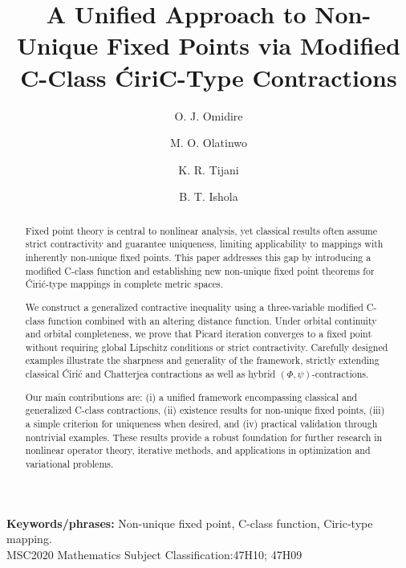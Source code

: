 \documentclass[11pt,reqno]{amsart}
\theoremstyle{definition}
\theoremstyle{remark}
\numberwithin{equation}{section}
\begin{document}
	\title{\bf{A Unified Approach to Non-Unique Fixed Points via Modified C-Class ĆiriC-Type Contractions}}
	\author[O. J. Omidire]{O. J. Omidire}
	\address{\textbf{O. J. Omidire}
		Department of Mathematical Sciences,
		Osun State University, Osogbo, Nigeria.}
\author[M. O. Olatinwo]{M. O. Olatinwo}
\address{\textbf{M. O. Olatinwo}
	Department of Mathematics,
	Obafemi Awolowo University, Ile Ife.}
	\author[K. R. Tijani]{K. R. Tijani}
\address{\textbf{K. R. Tijani}
	Department of Mathematical Sciences,
	Osun State University, Osogbo, Nigeria.}
\author[B. T. Ishola]{B. T. Ishola}
\address{\textbf{B. T. Ishola}
	Department of Mathematics,
	Obafemi Awolowo University, Ile Ife.}
\begin{abstract}
	Fixed point theory is central to nonlinear analysis, yet classical results often assume strict contractivity and guarantee uniqueness, limiting applicability to mappings with inherently non-unique fixed points. This paper addresses this gap by introducing a modified C-class function and establishing new non-unique fixed point theorems for Ćirić-type mappings in complete metric spaces.
	
	We construct a generalized contractive inequality using a three-variable modified C-class function combined with an altering distance function. Under orbital continuity and orbital completeness, we prove that Picard iteration converges to a fixed point without requiring global Lipschitz conditions or strict contractivity. Carefully designed examples illustrate the sharpness and generality of the framework, strictly extending classical Ćirić and Chatterjea contractions as well as hybrid $(\Phi,\psi)$-contractions.
	
	Our main contributions are: (i) a unified framework encompassing classical and generalized C-class contractions, (ii) existence results for non-unique fixed points, (iii) a simple criterion for uniqueness when desired, and (iv) practical validation through nontrivial examples. These results provide a robust foundation for further research in nonlinear operator theory, iterative methods, and applications in optimization and variational problems.
\end{abstract}
	\maketitle
	\textbf{Keywords/phrases:} Non-unique fixed point, C-class function, Ciric-type mapping.	~~\\
	MSC2020 Mathematics Subject Classification:47H10; 47H09\\
\end{document}
